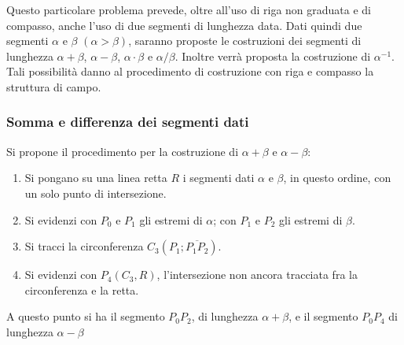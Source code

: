 Questo particolare problema prevede, oltre all'uso di riga non graduata e di compasso, anche l'uso di due segmenti di lunghezza data. Dati quindi due segmenti $\alpha$ e $\beta$ $(\alpha > \beta)$, saranno proposte le costruzioni dei segmenti di lunghezza $\alpha + \beta$, $\alpha - \beta$, $\alpha \cdot \beta$ e $\alpha/\beta$. Inoltre verrà proposta la costruzione di $\alpha^{-1}$. Tali possibilità danno al procedimento di costruzione con riga e compasso la struttura di campo. 


\subsubsection{Somma e differenza dei segmenti dati}
Si propone il procedimento per la costruzione di $\alpha + \beta$ e $\alpha - \beta$:
\begin{enumerate}

\item Si pongano su una linea retta $R$ i segmenti dati $\alpha$ e $\beta$, in questo ordine, con un solo punto di intersezione.

\item Si evidenzi con  $P_{0}$ e  $P_{1}$ gli estremi di $\alpha$; con $P_{1}$ e $P_{2}$ gli estremi di $\beta$.

\item Si tracci la circonferenza $C_{3}(P_{1}; \overline{P_{1} P_{2}})$.

\item Si evidenzi con $P_{4}(C_{3},R)$,  l'intersezione non ancora tracciata fra la circonferenza e la retta.

\end{enumerate}

A questo punto si ha il segmento $P_{0} P_{2}$, di lunghezza $\alpha + \beta$, e il segmento $P_{0} P_{4}$ di lunghezza $\alpha - \beta$ \\ \\


